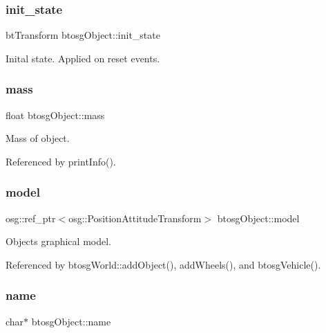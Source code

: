 \subsubsection{\texorpdfstring{init\+\_\+state}{init\_state}}
{\footnotesize\ttfamily bt\+Transform btosg\+Object\+::init\+\_\+state\hspace{0.3cm}{\ttfamily [inherited]}}



Inital state. Applied on reset events. 

\mbox{\label{classbtosgObject_a2418bb2194d5e9b0f1c51c84672ba7d1}} 
\subsubsection{\texorpdfstring{mass}{mass}}
{\footnotesize\ttfamily float btosg\+Object\+::mass\hspace{0.3cm}{\ttfamily [inherited]}}



Mass of object. 



Referenced by print\+Info().

\mbox{\label{classbtosgObject_afd15726e7a214212d6d5815f8ac1ac6c}} 
\subsubsection{\texorpdfstring{model}{model}}
{\footnotesize\ttfamily osg\+::ref\+\_\+ptr$<$osg\+::\+Position\+Attitude\+Transform$>$ btosg\+Object\+::model\hspace{0.3cm}{\ttfamily [inherited]}}



Object\textquotesingle{}s graphical model. 



Referenced by btosg\+World\+::add\+Object(), add\+Wheels(), and btosg\+Vehicle().

\mbox{\label{classbtosgObject_a12396e1362797a75473a2e833b579cc9}} 
\subsubsection{\texorpdfstring{name}{name}}
{\footnotesize\ttfamily char$\ast$ btosg\+Object\+::name\hspace{0.3cm}{\ttfamily [inherited]}}



